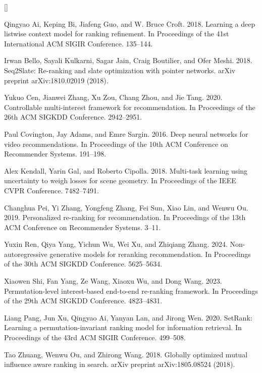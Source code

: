 \documentclass[10pt,twocolumn]{article}
\begin{document}
{\small
\begin{list}{[]}{%
  \setlength{\leftmargin}{2.2em}%
  \setlength{\labelwidth}{1.3em}%
  \setlength{\labelsep}{0.9em}%
  \setlength{\itemsep}{2pt}%
  \setlength{\parsep}{0pt}%
}
\item Qingyao Ai, Keping Bi, Jiafeng Guo, and W. Bruce Croft. 2018. Learning a deep listwise context model for ranking refinement. In Proceedings of the 41st International ACM SIGIR Conference. 135--144.
\item Irwan Bello, Sayali Kulkarni, Sagar Jain, Craig Boutilier, and Ofer Meshi. 2018. Seq2Slate: Re-ranking and slate optimization with pointer networks. arXiv preprint arXiv:1810.02019 (2018).
\item Yukuo Cen, Jianwei Zhang, Xu Zou, Chang Zhou, and Jie Tang. 2020. Controllable multi-interest framework for recommendation. In Proceedings of the 26th ACM SIGKDD Conference. 2942--2951.
\item Paul Covington, Jay Adams, and Emre Sargin. 2016. Deep neural networks for video recommendations. In Proceedings of the 10th ACM Conference on Recommender Systems. 191--198.
\item Alex Kendall, Yarin Gal, and Roberto Cipolla. 2018. Multi-task learning using uncertainty to weigh losses for scene geometry. In Proceedings of the IEEE CVPR Conference. 7482--7491.
\newpage
\item Changhua Pei, Yi Zhang, Yongfeng Zhang, Fei Sun, Xiao Lin, and Wenwu Ou. 2019. Personalized re-ranking for recommendation. In Proceedings of the 13th ACM Conference on Recommender Systems. 3--11.
\item Yuxin Ren, Qiya Yang, Yichun Wu, Wei Xu, and Zhiqiang Zhang. 2024. Non-autoregressive generative models for reranking recommendation. In Proceedings of the 30th ACM SIGKDD Conference. 5625--5634.
\item Xiaowen Shi, Fan Yang, Ze Wang, Xiaoxu Wu, and Dong Wang. 2023. Permutation-level interest-based end-to-end re-ranking framework. In Proceedings of the 29th ACM SIGKDD Conference. 4823--4831.
\item Liang Pang, Jun Xu, Qingyao Ai, Yanyan Lan, and Jirong Wen. 2020. SetRank: Learning a permutation-invariant ranking model for information retrieval. In Proceedings of the 43rd ACM SIGIR Conference. 499--508.
\item Tao Zhuang, Wenwu Ou, and Zhirong Wang. 2018. Globally optimized mutual influence aware ranking in search. arXiv preprint arXiv:1805.08524 (2018).
\end{list}
}
\end{document}
